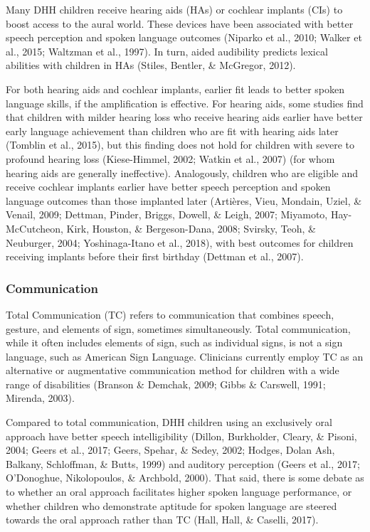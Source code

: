 \documentclass[english,man]{apa6}
\begin{document}
Many DHH children receive hearing aids (HAs) or cochlear implants (CIs) to boost access to the aural world. These devices have been associated with better speech perception and spoken language outcomes (Niparko et al., 2010; Walker et al., 2015; Waltzman et al., 1997). In turn, aided audibility predicts lexical abilities with children in HAs (Stiles, Bentler, \& McGregor, 2012).

For both hearing aids and cochlear implants, earlier fit leads to better spoken language skills, if the amplification is effective. For hearing aids, some studies find that children with milder hearing loss who receive hearing aids earlier have better early language achievement than children who are fit with hearing aids later (Tomblin et al., 2015), but this finding does not hold for children with severe to profound hearing loss (Kiese-Himmel, 2002; Watkin et al., 2007) (for whom hearing aids are generally ineffective). Analogously, children who are eligible and receive cochlear implants earlier have better speech perception and spoken language outcomes than those implanted later (Artières, Vieu, Mondain, Uziel, \& Venail, 2009; Dettman, Pinder, Briggs, Dowell, \& Leigh, 2007; Miyamoto, Hay-McCutcheon, Kirk, Houston, \& Bergeson-Dana, 2008; Svirsky, Teoh, \& Neuburger, 2004; Yoshinaga-Itano et al., 2018), with best outcomes for children receiving implants before their first birthday (Dettman et al., 2007).

\hypertarget{communication}{%
\subsubsection{Communication}\label{communication}}

Total Communication (TC) refers to communication that combines speech, gesture, and elements of sign, sometimes simultaneously. Total communication, while it often includes elements of sign, such as individual signs, is not a sign language, such as American Sign Language. Clinicians currently employ TC as an alternative or augmentative communication method for children with a wide range of disabilities (Branson \& Demchak, 2009; Gibbs \& Carswell, 1991; Mirenda, 2003).

Compared to total communication, DHH children using an exclusively oral approach have better speech intelligibility (Dillon, Burkholder, Cleary, \& Pisoni, 2004; Geers et al., 2017; Geers, Spehar, \& Sedey, 2002; Hodges, Dolan Ash, Balkany, Schloffman, \& Butts, 1999) and auditory perception (Geers et al., 2017; O'Donoghue, Nikolopoulos, \& Archbold, 2000). That said, there is some debate as to whether an oral approach facilitates higher spoken language performance, or whether children who demonstrate aptitude for spoken language are steered towards the oral approach rather than TC (Hall, Hall, \& Caselli, 2017).
\end{document}
